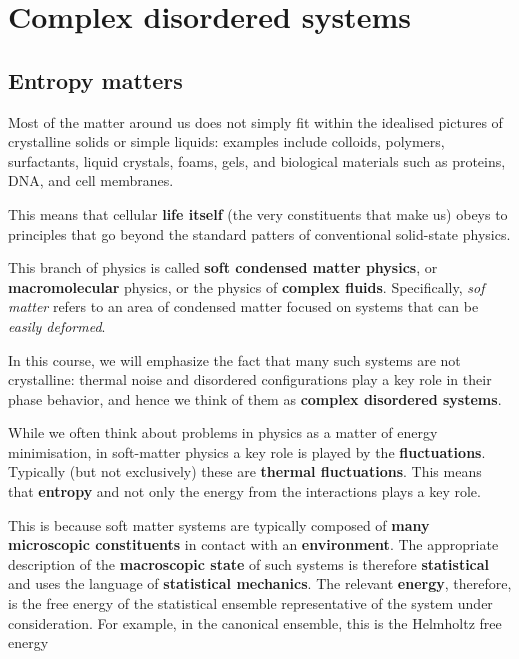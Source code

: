 \documentclass[
  letterpaper,
  enabledeprecatedfontcommands]{report}
\begin{document}
\part{Complex disordered systems}

\chapter{Entropy matters}\label{entropy-matters}

Most of the matter around us does not simply fit within the idealised
pictures of crystalline solids or simple liquids: examples include
colloids, polymers, surfactants, liquid crystals, foams, gels, and
biological materials such as proteins, DNA, and cell membranes.

This means that cellular \textbf{life itself} (the very constituents
that make us) obeys to principles that go beyond the standard patters of
conventional solid-state physics.

This branch of physics is called \textbf{soft condensed matter physics},
or \textbf{macromolecular} physics, or the physics of \textbf{complex
fluids}. Specifically, \emph{sof matter} refers to an area of condensed
matter focused on systems that can be \emph{easily deformed}.

In this course, we will emphasize the fact that many such systems are
not crystalline: thermal noise and disordered configurations play a key
role in their phase behavior, and hence we think of them as
\textbf{complex disordered systems}.

While we often think about problems in physics as a matter of energy
minimisation, in soft-matter physics a key role is played by the
\textbf{fluctuations}. Typically (but not exclusively) these are
\textbf{thermal fluctuations}. This means that \textbf{entropy} and not
only the energy from the interactions plays a key role.

\marginnote{\begin{footnotesize}

\end{footnotesize}}

This is because soft matter systems are typically composed of
\textbf{many microscopic constituents} in contact with an
\textbf{environment}. The appropriate description of the
\textbf{macroscopic state} of such systems is therefore
\textbf{statistical} and uses the language of \textbf{statistical
mechanics}. The relevant \textbf{energy}, therefore, is the free energy
of the statistical ensemble representative of the system under
consideration. For example, in the canonical ensemble, this is the
Helmholtz free energy
\end{document}
